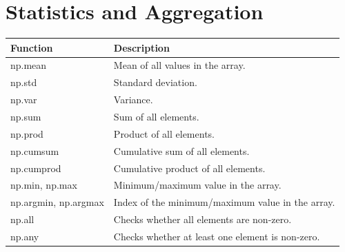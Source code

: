 \documentclass[
  english,
  letterpaper,
  DIV=11,
  numbers=noendperiod]{scrreprt}
\newcounter{none} %
\begin{document}
\section{Statistics and Aggregation}\label{statistics-and-aggregation}

{\def\LTcaptype{none} %
\begin{longtable}[]{@{}
  >{\raggedright\arraybackslash}p{}
  >{\raggedright\arraybackslash}p{}@{}}
\toprule\noalign{}
\begin{minipage}[b]{\linewidth}\raggedright
Function
\end{minipage} & \begin{minipage}[b]{\linewidth}\raggedright
Description
\end{minipage} \\
\midrule\noalign{}
\endhead
\bottomrule\noalign{}
\endlastfoot
np.mean & Mean of all values in the array. \\
np.std & Standard deviation. \\
np.var & Variance. \\
np.sum & Sum of all elements. \\
np.prod & Product of all elements. \\
np.cumsum & Cumulative sum of all elements. \\
np.cumprod & Cumulative product of all elements. \\
np.min, np.max & Minimum/maximum value in the array. \\
np.argmin, np.argmax & Index of the minimum/maximum value in the
array. \\
np.all & Checks whether all elements are non-zero. \\
np.any & Checks whether at least one element is non-zero. \\
\end{longtable}
}
\end{document}
